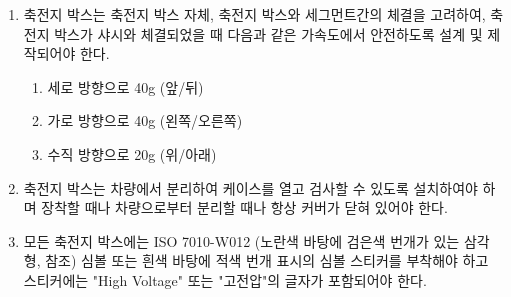 \documentclass[final,a4paper,10pt]{report}
\begin{document}
\begin{enumerate}
\begin{enumerate}
      \item\label{rule:formula-technical.accumulator-container-mechanical.joining.bolts-and-nuts} 볼트 및 너트
        \begin{enumerate}
          \item\label{rule:formula-technical.accumulator-container-mechanical.joining.bolts-and-nuts.strength-equivalence} 결합된 볼트와 너트의 강도가 \ref{item:축전지박스 패스너}과 동등하거나 그 이상을 입증해야 한다.
          \item\label{rule:formula-technical.accumulator-container-mechanical.joining.bolts-and-nuts.anti-loosening} \ref{item:체결장치의 풀림 방지}을 만족해야 한다.
        \end{enumerate}
    \end{enumerate}

  \item\label{rule:formula-technical.accumulator-container-mechanical.design-acceleration-loads} 축전지 박스는 축전지 박스 자체, 축전지 박스와 세그먼트간의 체결을 고려하여, 축전지 박스가 샤시와 체결되었을 때 다음과 같은 가속도에서 안전하도록 설계 및 제작되어야 한다. \label{item:축전지박스 가속도}
    \begin{enumerate}
      \item\label{rule:formula-technical.accumulator-container-mechanical.design-acceleration-loads.longitudinal-40g} 세로 방향으로 40g (앞/뒤)
      \item\label{rule:formula-technical.accumulator-container-mechanical.design-acceleration-loads.lateral-40g} 가로 방향으로 40g (왼쪽/오른쪽)
      \item\label{rule:formula-technical.accumulator-container-mechanical.design-acceleration-loads.vertical-20g} 수직 방향으로 20g (위/아래)
    \end{enumerate}

  \item\label{rule:formula-technical.accumulator-container-mechanical.cover-closed-when-mounting} 축전지 박스는 차량에서 분리하여 케이스를 열고 검사할 수 있도록 설치하여야 하며 장착할 때나 차량으로부터 분리할 때나 항상 커버가 닫혀 있어야 한다.
  \item\label{rule:formula-technical.accumulator-container-mechanical.high-voltage-warning-label} 모든 축전지 박스에는 ISO 7010-W012 (노란색 바탕에 검은색 번개가 있는 삼각형,  참조) 심볼 또는 흰색 바탕에 적색 번개 표시의 심볼 스티커를 부착해야 하고 스티커에는 "High Voltage" 또는 "고전압"의 글자가 포함되어야 한다.


\end{enumerate}
\end{document}
